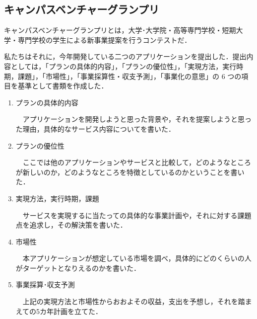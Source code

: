 \subsection{キャンパスベンチャーグランプリ}
\par
キャンパスベンチャーグランプリとは，大学･大学院・高等専門学校・短期大学・専門学校の学生による新事業提案を行うコンテストだ．
\par
私たちはそれに，今年開発している二つのアプリケーションを提出した．提出内容としては，「プランの具体的内容」，「プランの優位性」，「実現方法，実行時期，課題」，「市場性」，「事業採算性・収支予測」，「事業化の意思」の 6 つの項目を基準として書類を作成した．
\par
\begin{enumerate}
\item プランの具体的内容
\par
　アプリケーションを開発しようと思った背景や，それを提案しようと思った理由，具体的なサービス内容についてを書いた．
\par
\item プランの優位性
\par
　ここでは他のアプリケーションやサービスと比較して，どのようなところが新しいのか，どのようなところを特徴としているのかということを書いた．
\par
\item 実現方法，実行時期，課題
\par
　サービスを実現するに当たっての具体的な事業計画や，それに対する課題点を追求し，その解決策を書いた．
\par
\item 市場性
\par
　本アプリケーションが想定している市場を調べ，具体的にどのくらいの人がターゲットとなりえるのかを書いた．
\par
\item 事業採算･収支予測
\par
　上記の実現方法と市場性からおおよその収益，支出を予想し，それを踏まえての5カ年計画を立てた．
\end{enumerate}
\par
